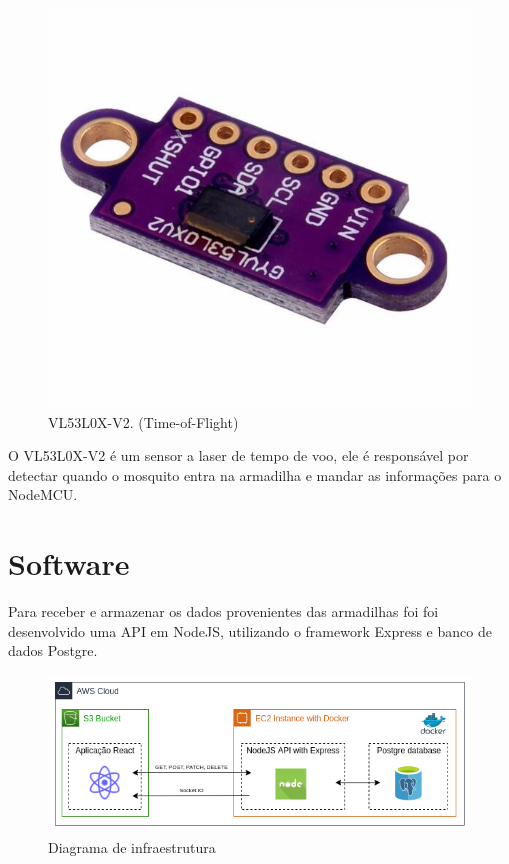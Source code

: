 \documentclass[
	12pt,				%
	openright,			%
	oneside,			%
	a4paper,			%
	chapter=TITLE,		%
	english,			%
	brazil				%
	]{abntex2}
\begin{document}
\begin{figure}[H]
\centering
\includegraphics[scale=0.1]{imagens/gy-vl53l0x.jpg}
\caption{VL53L0X-V2. (Time-of-Flight)}
    \label{fig:gy-vl53l0x}
\end{figure}

O VL53L0X-V2 é um sensor a laser de tempo de voo, ele é responsável por detectar quando o mosquito entra na armadilha e mandar as 
informações para o NodeMCU.

\section{Software}

Para receber e armazenar os dados provenientes das armadilhas foi foi desenvolvido uma API em NodeJS, utilizando o framework Express
 e banco de dados Postgre.

\begin{figure}[H]
\centering
\includegraphics[scale=0.6]{imagens/diagramacloud.png}
\caption{Diagrama de infraestrutura}
    \label{fig:cloud}
\end{figure}
\end{document}
